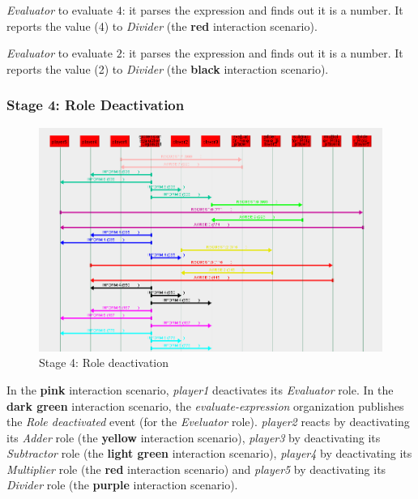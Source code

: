 \textit{Evaluator} to evaluate $4$: it parses the expression and finds out it is a number.
It reports the value (4) to \textit{Divider} (the \textbf{red} interaction scenario).

\textit{Evaluator} to evaluate $2$: it parses the expression and finds out it is a number.
It reports the value (2) to \textit{Divider} (the \textbf{black} interaction scenario).

\subsubsection*{Stage 4: Role Deactivation}

\begin{figure}[H]
	\centering
	\includegraphics[width=\textwidth]{images/examples/example2-stage4.png}
	\caption{Stage 4: Role deactivation}
	\label{figure:example2-stage4}
\end{figure}

In the \textbf{pink} interaction scenario, \textit{player1} deactivates its \textit{Evaluator} role.
In the \textbf{dark green} interaction scenario, the \textit{evaluate-expression} organization publishes the \textit{Role deactivated} event (for the \textit{Eveluator} role).
\textit{player2} reacts by deactivating its \textit{Adder} role (the \textbf{yellow} interaction scenario), \textit{player3} by deactivating its \textit{Subtractor} role (the \textbf{light green} interaction scenario), \textit{player4} by deactivating its \textit{Multiplier} role (the \textbf{red} interaction scenario) and \textit{player5} by deactivating its \textit{Divider} role (the \textbf{purple} interaction scenario).

